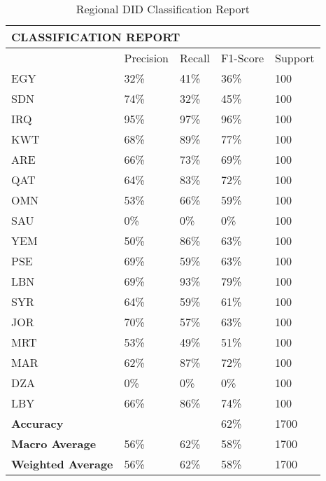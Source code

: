\begin{table}[h!]
    \centering
    \label{tab:regDIDclassifaction}
    \caption{Regional DID Classification Report}
    \begin{tabular}{|l|l|l|l|l|} 
    \hline
    \multicolumn{5}{|l|}{\textbf{CLASSIFICATION REPORT }}                \\ 
    \hline
                              & Precision & Recall & F1-Score & Support  \\ 
    \hline
    EGY                       & 32\%      & 41\%   & 36\%     & 100      \\ 
    \hline
    SDN                       & 74\%      & 32\%   & 45\%     & 100      \\ 
    \hline
    IRQ                       & 95\%      & 97\%   & 96\%     & 100      \\ 
    \hline
    KWT                       & 68\%      & 89\%   & 77\%     & 100      \\ 
    \hline
    ARE                       & 66\%      & 73\%   & 69\%     & 100      \\ 
    \hline
    QAT                       & 64\%      & 83\%   & 72\%     & 100      \\ 
    \hline
    OMN                       & 53\%      & 66\%   & 59\%     & 100      \\ 
    \hline
    SAU                       & 0\%       & 0\%    & 0\%      & 100      \\ 
    \hline
    YEM                       & 50\%      & 86\%   & 63\%     & 100      \\ 
    \hline
    PSE                       & 69\%      & 59\%   & 63\%     & 100      \\ 
    \hline
    LBN                       & 69\%      & 93\%   & 79\%     & 100      \\ 
    \hline
    SYR                       & 64\%      & 59\%   & 61\%     & 100      \\ 
    \hline
    JOR                       & 70\%      & 57\%   & 63\%     & 100      \\ 
    \hline
    MRT                       & 53\%      & 49\%   & 51\%     & 100      \\ 
    \hline
    MAR                       & 62\%      & 87\%   & 72\%     & 100      \\ 
    \hline
    DZA                       & 0\%       & 0\%    & 0\%      & 100      \\ 
    \hline
    LBY                       & 66\%      & 86\%   & 74\%     & 100      \\ 
    \hline
    \textbf{Accuracy}         &           &        & 62\%     & 1700     \\ 
    \hline
    \textbf{Macro Average}    & 56\%      & 62\%   & 58\%     & 1700     \\ 
    \hline
    \textbf{Weighted Average} & 56\%      & 62\%   & 58\%     & 1700     \\
    \hline
    \end{tabular}
    \end{table}

